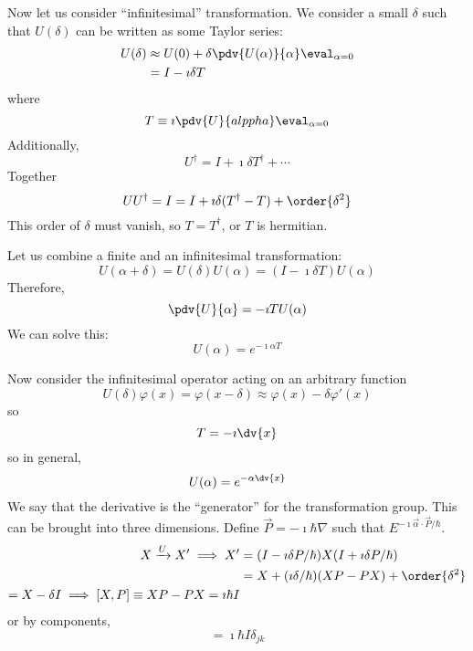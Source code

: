 \documentclass[a4paper,twoside,master.tex]{subfiles}
\begin{document}
Now let us consider ``infinitesimal'' transformation. We consider a small $ \delta $ such that $ U(\delta) $ can be written as some Taylor series:
\begin{align}
    U(\delta)&\approx U(0) + \delta \pdv{U(\alpha)}{\alpha}\eval_{\alpha = 0}\\
    &= I - \imath \delta T
\end{align}
where
\begin{equation}
    T\equiv \imath \pdv{U}{alppha}\eval_{\alpha = 0}
\end{equation}
Additionally,
\begin{equation}
    U^\dagger = I + \imath\delta T^\dagger + \cdots
\end{equation}
Together
\begin{equation}
    U U^\dagger = I = I + \imath \delta (T^\dagger - T) + \order{\delta^2}
\end{equation}
This order of $\delta$ must vanish, so $ T = T^\dagger $, or $ T $ is hermitian.

Let us combine a finite and an infinitesimal transformation:
\begin{equation}
    U(\alpha + \delta) = U(\delta) U(\alpha) = (I-\imath\delta T)U(\alpha)
\end{equation}
Therefore,
\begin{equation}
    \pdv{U}{\alpha} = -\imath T U(\alpha)
\end{equation}
We can solve this:
\begin{equation}
    U(\alpha) = e^{-\imath\alpha T}
\end{equation}

Now consider the infinitesimal operator acting on an arbitrary function
\begin{equation}
    U(\delta) \varphi(x) = \varphi(x - \delta)\approx \varphi(x) - \delta \varphi'(x)
\end{equation}
so
\begin{equation}
    T = -\imath \dv{x}
\end{equation}
so in general,
\begin{equation}
    U(\alpha) = e^{- \alpha \dv{x}}
\end{equation}
We say that the derivative is the ``generator'' for the transformation group. This can be brought into three dimensions. Define $ \vec{P} = -\imath\hbar\nabla $ such that $ E^{-\imath \vec{\alpha} \cdot \vec{P} / \hbar} $.
\begin{align}
    X \xrightarrow{U} X' \implies X' &= (I-\imath\delta P/\hbar)X(I+\imath\delta P/\hbar)\\
    &= X + (\imath\delta/\hbar)(XP-PX) + \order{\delta^2}\\
    = X - \delta I \implies [X,P] \equiv XP-PX = \imath\hbar I
\end{align}
or by components,
\begin{equation}
    [ \vec{R}_j, \vec{P}_k ] = \imath\hbar I \delta_{jk}
\end{equation}
\end{document}
